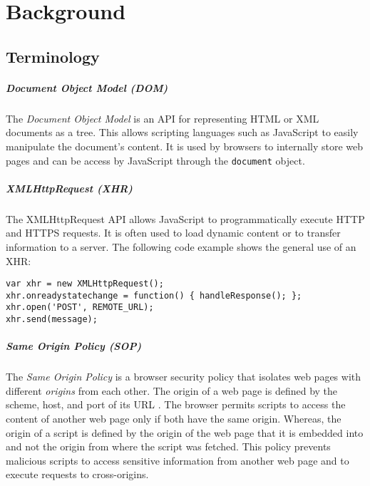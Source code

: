 
\chapter{Background}


\section{Terminology}

\paragraph{Document Object Model (DOM)}

	The \textit{Document Object Model} is an API for representing HTML or XML documents as a tree. This allows scripting languages such as JavaScript to easily manipulate the document's content. It is used by browsers to internally store web pages and can be access by JavaScript through the \texttt{document} object. 

\paragraph{XMLHttpRequest (XHR)}

	The XMLHttpRequest API allows JavaScript to programmatically execute HTTP and HTTPS requests. It is often used to load dynamic content or to transfer information to a server. The following code example shows the general use of an XHR:
	
	\begin{lstlisting}
var xhr = new XMLHttpRequest();
xhr.onreadystatechange = function() { handleResponse(); };
xhr.open('POST', REMOTE_URL);
xhr.send(message);
\end{lstlisting}

\paragraph{Same Origin Policy (SOP)}
	
	The \textit{Same Origin Policy} is a browser security policy that isolates web pages with different \textit{origins} from each other. The origin of a web page is defined by the scheme, host, and port of its URL \cite{w3cOriginSpecification}. The browser permits scripts to access the content of another web page only if both have the same origin. Whereas, the origin of a script is defined by the origin of the web page that it is embedded into and not the origin from where the script was fetched. This policy prevents malicious scripts to access sensitive information from another web page and to execute requests to cross-origins. 
	
